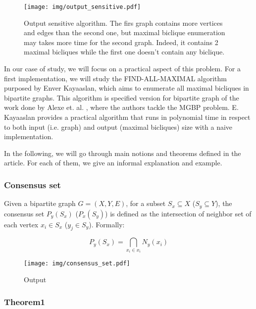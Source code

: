 \documentclass[table]{report}
\begin{document}


\begin{figure}[h]%
\centering
\texttt{[image: img/output\_sensitive.pdf]}
\caption{Output sensitive algorithm. The firs graph contains more vertices and edges than the second one, but maximal biclique enumeration may takes more time for the second graph. Indeed, it contains 2 maximal bicliques while the first one doesn't contain any biclique.}
\label{fig:output_sensitive}
\end{figure}
\FloatBarrier


In our case of study, we will focus on a practical aspect of this problem. For a first implementation, we will study the FIND-ALL-MAXIMAL algorithm purposed by Enver Kayaaslan, which aims to enumerate all maximal bicliques in bipartite graphs. This algorithm is specified version for bipartite graph of the work done by Alexe et. al. \cite{alexe}, where the authors tackle the MGBP problem. E. Kayaaslan provides a practical algorithm that runs in polynomial time in respect to both input (i.e. graph) and output (maximal bicliques) size with a naive implementation.

In the following, we will go through main notions and theorems defined in the article. For each of them, we give an informal explanation and example.

\subsubsection{Consensus set}  

Given a bipartite graph $G = (X,Y,E)$, for a subset $S_x \subseteq X$ ($S_y \subseteq Y$), the consensus set $P_y(S_x)$ ($P_x(S_y)$) is defined as the intersection of neighbor set of each vertex $x_i \in S_x$ ($y_j \in S_y$).\cite{kayaaslan} Formally:

$$ P_y(S_x) = \bigcap\limits_{x_i \in x_i}N_y(x_i)$$ 


\begin{figure}[h]%
\centering
\texttt{[image: img/consensus\_set.pdf]}
\caption{Output}
\label{fig:consensus_set}
\end{figure}
\FloatBarrier


\subsubsection{Theorem1}  
\end{document}
